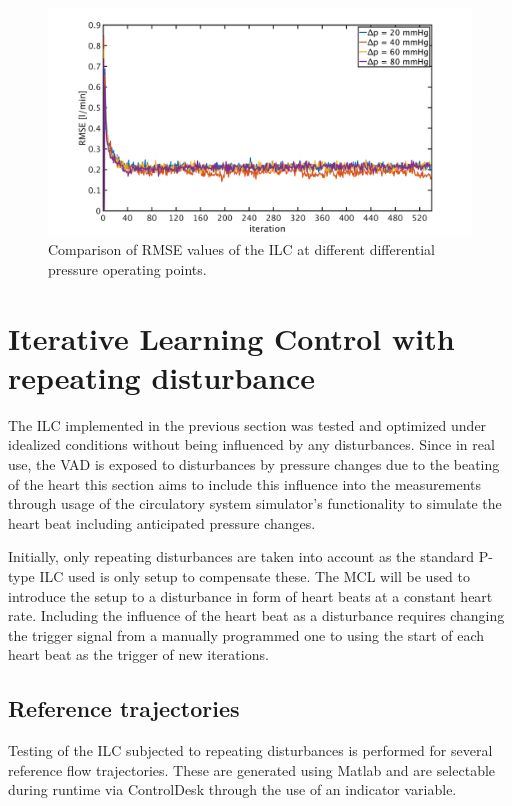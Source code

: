\begin{figure}[ht]
  \centering
  \includegraphics[width=\textwidth]{images/chapt_5/ILC/RMSE_compare_operating_points.pdf}
  \caption[Comparison of RMSE values of the ILC at different differential pressure operating points]{Comparison of RMSE values of the ILC at different differential pressure operating points.}
  \label{fig:RMSE_compare_operating_points}
\end{figure}
\section{Iterative Learning Control with repeating disturbance}

The ILC implemented in the previous section was tested and optimized under idealized conditions without being influenced by any disturbances. Since in real use, the VAD is exposed to disturbances by pressure changes due to the beating of the heart this section aims to include this influence into the measurements through usage of the circulatory system simulator's functionality to simulate the heart beat including anticipated pressure changes.

Initially, only repeating disturbances are taken into account as the standard P-type ILC used is only setup to compensate these.
The MCL will be used to introduce the setup to a disturbance in form of heart beats at a constant heart rate. Including the influence of the heart beat as a disturbance requires changing the trigger signal from a manually programmed one to using the start of each heart beat as the trigger of new iterations.
\subsection{Reference trajectories}\label{ref_traject}
Testing of the ILC subjected to repeating disturbances is performed for several reference flow trajectories. These are generated using Matlab and are selectable during runtime via ControlDesk through the use of an indicator variable.

